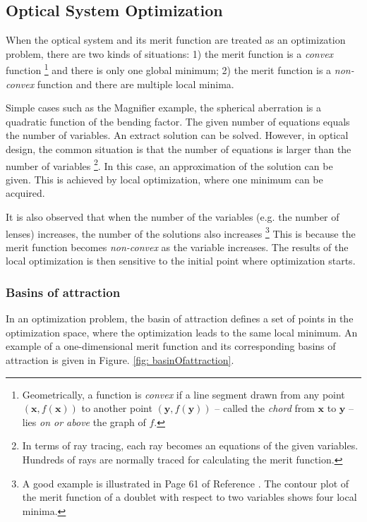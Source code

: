 \subsection{Optical System Optimization }
\vspace{1em}
When the optical system and its merit function are treated as an optimization problem, there are two kinds of situations: 1) the merit function is a \textit{convex} function \footnote{Geometrically, a function is \textit{convex} if a line segment drawn from any point $(\pmb{x}, f(\pmb{x}))$ to another point $(\pmb{y}, f(\pmb{y}))$ -- called the \textit{chord} from $\pmb{x}$ to $\pmb{y}$ -- lies \textit{on or above} the graph of $f$.} and there is only one global minimum; 2) the merit function is a \textit{non-convex} function and there are multiple local minima. 

Simple cases such as the Magnifier example, the spherical aberration is a quadratic function of the bending factor.  The given number of equations equals the number of variables. An extract solution can be solved. However, in optical design, the common situation is that the number of equations is larger than the number of variables \footnote{In terms of ray tracing, each ray becomes an equations of the given variables. Hundreds of rays are normally traced for calculating the merit function.}. In this case, an approximation of the solution can be given. This is achieved by local optimization, where one minimum can be acquired. 

It is also observed that when the number of the variables (e.g. the number of lenses) increases, the number of the solutions also increases \footnote{A good example is illustrated in Page 61 of Reference \cite{vanTurnhoutThesis2009}. The contour plot of the merit function of a doublet with respect to two variables shows four local minima.} This is because the merit function becomes \textit{non-convex} as the variable increases. The results of the local optimization is then sensitive to the initial point where optimization starts.  

\subsubsection{Basins of attraction \label{label: basinOfattrac}}
\vspace{1em}
In an optimization problem, the basin of attraction defines a set of points in the optimization space, where the optimization leads to the same local minimum. An example of a one-dimensional merit function and its corresponding basins of attraction is given in Figure. \ref{fig: basinOfattraction}. 

